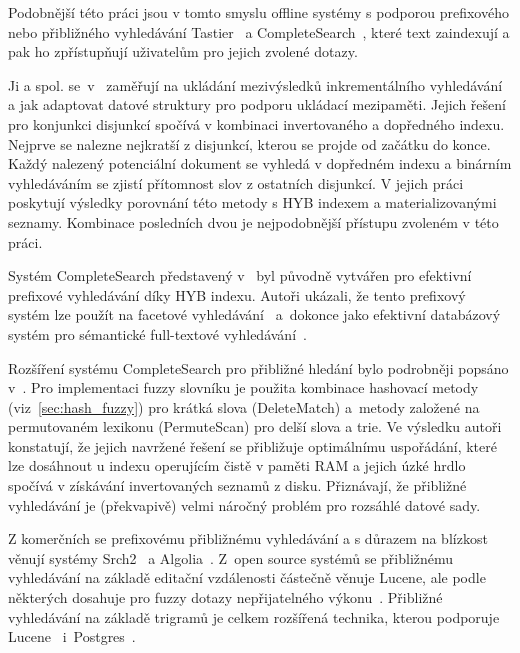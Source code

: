\documentclass[11pt,letterpaper,oneside,openright]{book}
\begin{document}
Podobnější této práci jsou v tomto smyslu offline systémy s podporou
prefixového nebo přibližného vyhledávání
Tastier~\cite{Ji:2009:EIF:1526709.1526760} a
CompleteSearch~\cite{Bast:2006:TLF:1148170.1148234}, které text zaindexují a pak
ho zpřístupňují uživatelům pro jejich zvolené dotazy.

Ji a spol. se~v~\cite{Ji:2009:EIF:1526709.1526760} zaměřují na ukládání
mezivýsledků inkrementálního vyhledávání a jak adaptovat datové struktury pro
podporu ukládací mezipaměti. Jejich řešení pro konjunkci disjunkcí spočívá v
kombinaci invertovaného a dopředného indexu. Nejprve se nalezne nejkratší z
disjunkcí, kterou se projde od začátku do konce. Každý nalezený potenciální
dokument se vyhledá v dopředném indexu a binárním vyhledáváním se zjistí
přítomnost slov z ostatních disjunkcí. V jejich práci poskytují výsledky
porovnání této metody s HYB indexem a materializovanými seznamy. Kombinace
posledních dvou je nejpodobnější přístupu zvoleném v této práci.

Systém CompleteSearch představený v~\cite{Bast:2006:TLF:1148170.1148234} byl
původně vytvářen pro efektivní prefixové vyhledávání díky HYB indexu. Autoři
ukázali, že tento prefixový systém lze použít na facetové
vyhledávání~\cite{Bast_abstractwhen} a~dokonce jako efektivní databázový
systém pro sémantické full-textové
vyhledávání~\cite{Bast:2007:EES:1277741.1277856}.

Rozšíření systému CompleteSearch pro přibližné hledání bylo podrobněji popsáno
v~\cite{Bast:2013:EFS:2457465.2457470}. Pro implementaci fuzzy slovníku je
použita kombinace hashovací metody (viz~\ref{sec:hash_fuzzy}) pro krátká slova
(DeleteMatch) a~metody založené na permutovaném lexikonu (PermuteScan) pro
delší slova a trie. Ve výsledku autoři konstatují, že jejich navržené řešení se
přibližuje optimálnímu uspořádání, které lze dosáhnout u indexu operujícím
čistě v paměti RAM a jejich úzké hrdlo spočívá v získávání invertovaných
seznamů z disku. Přiznávají, že přibližné vyhledávání je (překvapivě) velmi
náročný problém pro rozsáhlé datové sady.

Z komerčních se prefixovému přibližnému vyhledávání a s důrazem na blízkost
věnují systémy Srch2~\cite{srch2_website} a Algolia~\cite{algolia_website}.
Z~open source systémů se přibližnému vyhledávání na základě editační
vzdálenosti částečně věnuje Lucene, ale podle některých dosahuje pro fuzzy
dotazy nepřijatelného
výkonu~\cite{Bast:2013:EFS:2457465.2457470,algolia_vs_elasticsearch}. Přibližné
vyhledávání na základě trigramů je celkem rozšířená technika, kterou podporuje
Lucene~\cite{lucene_website} i~Postgres~\cite{postgres_website}.
\end{document}
